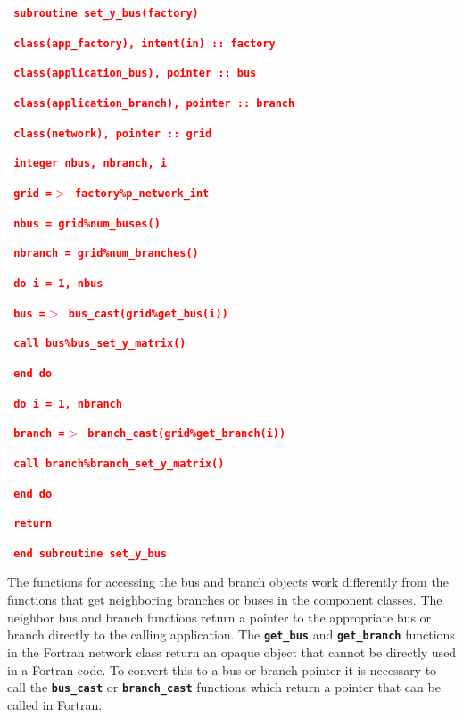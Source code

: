 \documentclass[12pt]{report} %
\begin{document}
\textcolor{red}{\texttt{\textbf{  subroutine set\_y\_bus(factory)}}}

\textcolor{red}{\texttt{\textbf{    class(app\_factory), intent(in) :: factory}}}

\textcolor{red}{\texttt{\textbf{    class(application\_bus), pointer :: bus}}}

\textcolor{red}{\texttt{\textbf{    class(application\_branch), pointer :: branch}}}

\textcolor{red}{\texttt{\textbf{    class(network), pointer :: grid}}}

\textcolor{red}{\texttt{\textbf{    integer nbus, nbranch, i}}}

\textcolor{red}{\texttt{\textbf{    grid =$\boldsymbol{\mathrm{>}}$ factory\%p\_network\_int}}}

\textcolor{red}{\texttt{\textbf{    nbus = grid\%num\_buses()}}}

\textcolor{red}{\texttt{\textbf{    nbranch = grid\%num\_branches()}}}

\textcolor{red}{\texttt{\textbf{    do i = 1, nbus}}}

\textcolor{red}{\texttt{\textbf{      bus =$\boldsymbol{\mathrm{>}}$ bus\_cast(grid\%get\_bus(i))}}}

\textcolor{red}{\texttt{\textbf{      call bus\%bus\_set\_y\_matrix()}}}

\textcolor{red}{\texttt{\textbf{    end do}}}

\textcolor{red}{\texttt{\textbf{    do i = 1, nbranch}}}

\textcolor{red}{\texttt{\textbf{      branch =$\boldsymbol{\mathrm{>}}$ branch\_cast(grid\%get\_branch(i))}}}

\textcolor{red}{\texttt{\textbf{      call branch\%branch\_set\_y\_matrix()}}}

\textcolor{red}{\texttt{\textbf{    end do}}}

\textcolor{red}{\texttt{\textbf{    return}}}

\textcolor{red}{\texttt{\textbf{  end subroutine set\_y\_bus}}}

The functions for accessing the bus and branch objects work differently from the functions that get neighboring branches or buses in the component classes. The neighbor bus and branch functions return a pointer to the appropriate bus or branch directly to the calling application. The \texttt{\textbf{get\_bus}} and \texttt{\textbf{get\_branch}} functions in the Fortran network class return an opaque object that cannot be directly used in a Fortran code. To convert this to  a bus or branch pointer it is necessary to call the \texttt{\textbf{bus\_cast}} or \texttt{\textbf{branch\_cast}} functions which return a pointer that can be called in Fortran.
\end{document}
